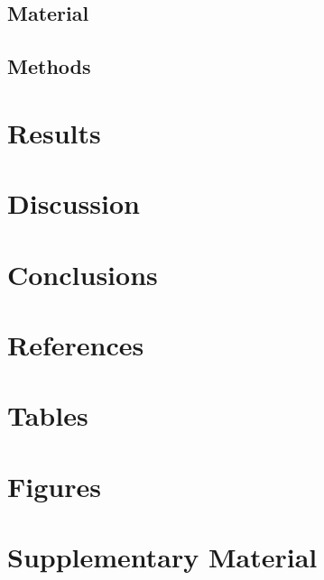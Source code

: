 \documentclass[12pt,halfline,a4paper]{ouparticle}
\begin{document}
\subsection{Material}\label{material}


\subsection{Methods} \label{methods}
 

\section{Results}\label{results}


\section{Discussion}\label{discussion}


\section{Conclusions}\label{conclusions}  
  


\section{References}
\newpage
 
 

\newpage
\section{Tables}
%

\newpage
\clearpage\newpage
\section*{Figures}


\newpage
\clearpage\newpage
\section*{Supplementary Material}
%
\end{document}
